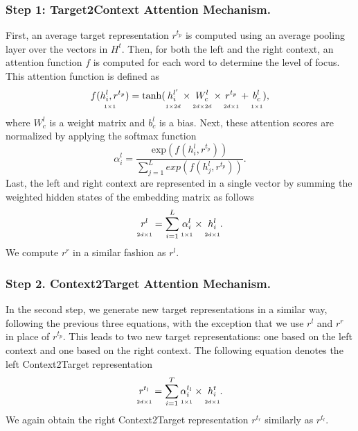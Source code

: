 \subsubsection{Step 1: Target2Context Attention Mechanism.}
First, an average target representation $r^{t_p}$ is computed using an average pooling layer over the vectors in $H^t$. Then, for both the left and the right context, an attention function $f$ is computed for each word to determine the level of focus. This attention function is defined as
\begin{equation}
    \underset{\scriptscriptstyle 1\times 1}{f(h_i^l, r^{t_p})\strut}=\mathrm{tanh}(\underset{\scriptscriptstyle 1\times 2d}{h_i^{l'}\strut}\times \underset{\scriptscriptstyle 2d\times 2d}{W_c^l\strut}\times \underset{\scriptscriptstyle 2d\times 1}{r^{t_p}\strut}+\underset{\scriptscriptstyle 1\times 1}{b_c^l\strut}),
\end{equation}
where $W_c^l$ is a weight matrix and $b_c^l$ is a bias. Next, these attention scores are normalized by applying the softmax function
\begin{equation}
    \alpha_i^l=\frac{\mathrm{exp}(f(h_i^l,r^{t_p}))}{\sum^L_{j=1} exp(f(h_j^l,r^{t_p}))}.
\end{equation}
Last, the left and right context are represented in a single vector by summing the weighted hidden states of the embedding matrix as follows
\begin{equation}
    \underset{\scriptscriptstyle 2d\times 1}{r^l\strut}=\sum^L_{i=1} \underset{\scriptscriptstyle 1\times 1}{\alpha_i^l\strut}\times \underset{\scriptscriptstyle 2d\times 1}{h_i^l\strut}.
\end{equation}
We compute $r^r$ in a similar fashion as $r^l$.

\subsubsection{Step 2. Context2Target Attention Mechanism.}
In the second step, we generate new target representations in a similar way, following the previous three equations, with the exception that we use $r^l$ and $r^r$ in place of $r^{t_p}$. This leads to two new target representations: one based on the left context and one based on the right context. The following equation denotes the left Context2Target representation
\begin{equation}
    \underset{\scriptscriptstyle 2d\times 1}{r^{t_l}\strut}=\sum_{i=1}^T \underset{\scriptscriptstyle 1\times 1}{\alpha_i^{t_l}\strut}\times \underset{\scriptscriptstyle 2d\times 1}{h_i^t\strut}.
\end{equation}
We again obtain the right Context2Target representation $r^{t_r}$ similarly as $r^{t_l}$.

